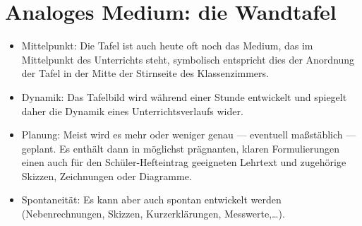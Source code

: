 \section{Analoges Medium: die Wandtafel}
\begin{itemize}
\item Mittelpunkt: Die Tafel ist auch heute oft noch das Medium, das im
Mittelpunkt des Unterrichts steht,
symbolisch entspricht dies der Anordnung der Tafel in
der Mitte der Stirnseite des Klassenzimmers.

\item Dynamik: Das Tafelbild wird w\"{a}hrend einer Stunde entwickelt
und spiegelt daher die Dynamik eines Unterrichts\-verlaufs wider.

\item Planung: Meist wird es mehr oder weniger genau --- eventuell
ma{\ss}st\"{a}blich --- geplant.
Es enth\"{a}lt dann in m\"{o}glichst pr\"{a}gnanten, klaren Formulierungen einen
auch f\"{u}r den Sch\"{u}ler-Hefteintrag geeigneten Lehrtext
und zugeh\"{o}rige Skizzen, Zeichnungen oder Diagramme.

\item Spontaneit\"{a}t: Es kann aber auch spontan entwickelt werden
(Nebenrechnungen, Skizzen, Kurzerkl\"{a}rungen, Messwerte,\dots).
\end{itemize}

